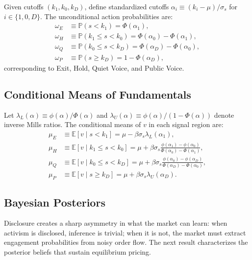 \documentclass[11pt]{article}
\newcommand{\E}{\mathbb{E}}
\newcommand{\PP}{\mathbb{P}}
\newcommand{\1}{\mathbf{1}}
\begin{document}
Given cutoffs $(k_1, k_0, k_D)$, define standardized cutoffs $\alpha_i \equiv (k_i - \mu)/\sigma_s$ for $i \in \{1, 0, D\}$. The unconditional action probabilities are:
\begin{align*}
\omega_E &\equiv \PP(s < k_1) = \Phi(\alpha_1), \\
\omega_H &\equiv \PP(k_1 \leq s < k_0) = \Phi(\alpha_0) - \Phi(\alpha_1), \\
\omega_Q &\equiv \PP(k_0 \leq s < k_D) = \Phi(\alpha_D) - \Phi(\alpha_0), \\
\omega_P &\equiv \PP(s \geq k_D) = 1 - \Phi(\alpha_D),
\end{align*}
corresponding to Exit, Hold, Quiet Voice, and Public Voice.

%
\subsection{Conditional Means of Fundamentals}
%

Let $\lambda_L(\alpha) \equiv \phi(\alpha)/\Phi(\alpha)$ and $\lambda_U(\alpha) \equiv \phi(\alpha)/(1-\Phi(\alpha))$ denote inverse Mills ratios. The conditional means of $v$ in each signal region are:
\begin{align*}
\mu_E &\equiv \E[v \mid s < k_1] = \mu - \beta\sigma_s \lambda_L(\alpha_1), \\
\mu_H &\equiv \E[v \mid k_1 \leq s < k_0] = \mu + \beta\sigma_s \frac{\phi(\alpha_1) - \phi(\alpha_0)}{\Phi(\alpha_0) - \Phi(\alpha_1)}, \\
\mu_Q &\equiv \E[v \mid k_0 \leq s < k_D] = \mu + \beta\sigma_s \frac{\phi(\alpha_0) - \phi(\alpha_D)}{\Phi(\alpha_D) - \Phi(\alpha_0)}, \\
\mu_P &\equiv \E[v \mid s \geq k_D] = \mu + \beta\sigma_s \lambda_U(\alpha_D).
\end{align*}

%
\subsection{Bayesian Posteriors}
%

Disclosure creates a sharp asymmetry in what the market can learn: when activism is disclosed, inference is trivial; when it is not, the market must extract engagement probabilities from noisy order flow. The next result characterizes the posterior beliefs that sustain equilibrium pricing.
\end{document}
